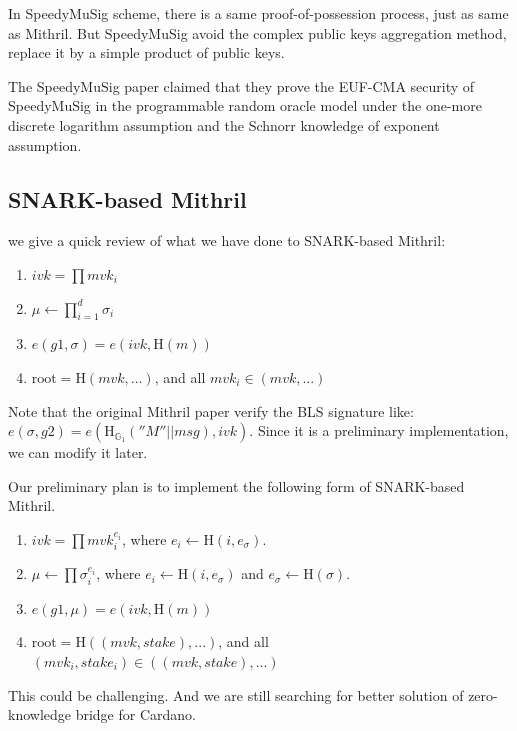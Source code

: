 \documentclass{article}
\begin{document}
In SpeedyMuSig scheme, there is a same proof-of-possession process, just as same as Mithril. But SpeedyMuSig avoid the complex public keys aggregation method, replace it by a simple product of public keys.

The SpeedyMuSig paper claimed that they prove the EUF-CMA security of SpeedyMuSig in the programmable random oracle model under the one-more discrete logarithm assumption and the Schnorr knowledge of exponent assumption. 

\subsection{SNARK-based Mithril}

we give a quick review of what we have done to SNARK-based Mithril:

\begin{enumerate}
    \item $ivk = \prod mvk_i$
    \item $\mu \leftarrow \prod_{i=1}^d \sigma_i$
    \item $e(g1, \sigma) = e(ivk, \textrm{H}(m))$
    \item $\textrm{root} = \textrm{H}(mvk,...)$, and all $mvk_i \in (mvk, ...)$
\end{enumerate}

Note that the original Mithril paper verify the BLS signature like: $e(\sigma, g2) = e(\textrm{H}_{\mathbb{G}_1}(''M''||msg), ivk)$. Since it is a preliminary implementation, we can modify it later.

Our preliminary plan is to implement the following form of SNARK-based Mithril.

\begin{enumerate}
    \item $ivk=\prod mvk_i^{e_i} $, where $e_i \leftarrow \textrm{H}(i,e_\sigma)$.
    \item $\mu \leftarrow \prod \sigma_i^{e_i}$, where $e_i \leftarrow \textrm{H}(i,e_\sigma)$ and $e_\sigma \leftarrow \textrm{H}(\mathbb{\sigma})$.
    \item $e(g1, \mu) = e(ivk, \textrm{H}(m))$
    \item $\textrm{root} = \textrm{H}((mvk,stake),...)$, and all $(mvk_i, stake_i) \in ((mvk,stake),...)$
\end{enumerate}

This could be challenging. And we are still searching for better solution of zero-knowledge bridge for Cardano.
\end{document}
